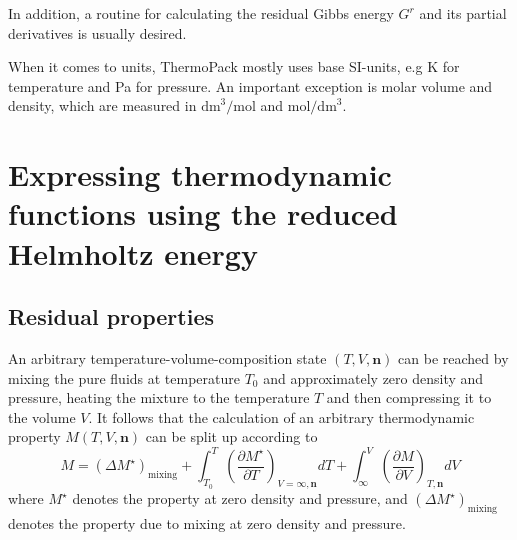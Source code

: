 \documentclass[english]{../thermomemo/thermomemo}
\newcommand{\mbn}[0]{\mathbf n}
\newcommand{\lp}{\left(}
\newcommand{\rp}{\right)}
\numberwithin{equation}{section}
\begin{document}
In addition, a routine for calculating the residual Gibbs energy $G^r$
and its partial derivatives is usually desired.

When it comes to units, ThermoPack mostly uses base SI-units, e.g K
for temperature and Pa for pressure. An important exception is
molar volume and density, which are measured in
$\mathrm{dm}^3/\mathrm{mol}$ and $\mathrm{mol}/\mathrm{dm}^3$.



\section{Expressing thermodynamic functions using the reduced Helmholtz energy}

\subsection{Residual properties}
An arbitrary temperature-volume-composition state $(T,V,\mbn)$ can be reached by mixing
the pure fluids at temperature $T_0$ and approximately zero density and
pressure, heating the mixture to the temperature $T$ and then
compressing it to the volume $V$. It follows that the calculation of
an arbitrary thermodynamic property $M(T,V,\mbn)$ can be split up
according to
\begin{equation}
  \label{M_TVN}
  M = (\Delta M^\star)_{\text{mixing}} + \int_{T_0}^T \lp
  \frac{\partial M^\star}{\partial T} \rp_{V=\infty,\mbn} dT +
  \int_{\infty}^V \lp \frac{\partial M}{\partial V} \rp_{T,\mbn} dV
\end{equation}
where $M^\star$ denotes the property at zero density and pressure, and $(\Delta M^\star)_{\text{mixing}}$ denotes the property due to
mixing at zero density and pressure.
\end{document}
